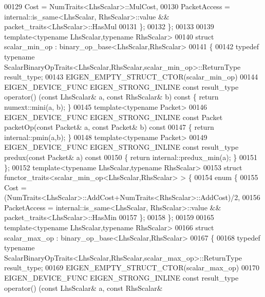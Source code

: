 \begin{DoxyCode}
00129     Cost = NumTraits<LhsScalar>::MulCost,
00130     PacketAccess = internal::is\_same<LhsScalar, RhsScalar>::value && packet\_traits<LhsScalar>::HasMul
00131   \};
00132 \};
00133 
00139 \textcolor{keyword}{template}<\textcolor{keyword}{typename} LhsScalar,\textcolor{keyword}{typename} RhsScalar>
00140 \textcolor{keyword}{struct }scalar\_min\_op : binary\_op\_base<LhsScalar,RhsScalar>
00141 \{
00142   \textcolor{keyword}{typedef} \textcolor{keyword}{typename} ScalarBinaryOpTraits<LhsScalar,RhsScalar,scalar\_min\_op>::ReturnType result\_type;
00143   EIGEN\_EMPTY\_STRUCT\_CTOR(scalar\_min\_op)
00144   EIGEN\_DEVICE\_FUNC EIGEN\_STRONG\_INLINE \textcolor{keyword}{const} result\_type operator() (\textcolor{keyword}{const} LhsScalar& a, \textcolor{keyword}{const} RhsScalar& 
      b)\textcolor{keyword}{ const }\{ \textcolor{keywordflow}{return} numext::mini(a, b); \}
00145   \textcolor{keyword}{template}<\textcolor{keyword}{typename} Packet>
00146   EIGEN\_DEVICE\_FUNC EIGEN\_STRONG\_INLINE \textcolor{keyword}{const} Packet packetOp(\textcolor{keyword}{const} Packet& a, \textcolor{keyword}{const} Packet& b)\textcolor{keyword}{ const}
00147 \textcolor{keyword}{  }\{ \textcolor{keywordflow}{return} internal::pmin(a,b); \}
00148   \textcolor{keyword}{template}<\textcolor{keyword}{typename} Packet>
00149   EIGEN\_DEVICE\_FUNC EIGEN\_STRONG\_INLINE \textcolor{keyword}{const} result\_type predux(\textcolor{keyword}{const} Packet& a)\textcolor{keyword}{ const}
00150 \textcolor{keyword}{  }\{ \textcolor{keywordflow}{return} internal::predux\_min(a); \}
00151 \};
00152 \textcolor{keyword}{template}<\textcolor{keyword}{typename} LhsScalar,\textcolor{keyword}{typename} RhsScalar>
00153 \textcolor{keyword}{struct }functor\_traits<scalar\_min\_op<LhsScalar,RhsScalar> > \{
00154   \textcolor{keyword}{enum} \{
00155     Cost = (NumTraits<LhsScalar>::AddCost+NumTraits<RhsScalar>::AddCost)/2,
00156     PacketAccess = internal::is\_same<LhsScalar, RhsScalar>::value && packet\_traits<LhsScalar>::HasMin
00157   \};
00158 \};
00159 
00165 \textcolor{keyword}{template}<\textcolor{keyword}{typename} LhsScalar,\textcolor{keyword}{typename} RhsScalar>
00166 \textcolor{keyword}{struct }scalar\_max\_op  : binary\_op\_base<LhsScalar,RhsScalar>
00167 \{
00168   \textcolor{keyword}{typedef} \textcolor{keyword}{typename} ScalarBinaryOpTraits<LhsScalar,RhsScalar,scalar\_max\_op>::ReturnType result\_type;
00169   EIGEN\_EMPTY\_STRUCT\_CTOR(scalar\_max\_op)
00170   EIGEN\_DEVICE\_FUNC EIGEN\_STRONG\_INLINE \textcolor{keyword}{const} result\_type operator() (\textcolor{keyword}{const} LhsScalar& a, \textcolor{keyword}{const} RhsScalar& 

\end{DoxyCode}
